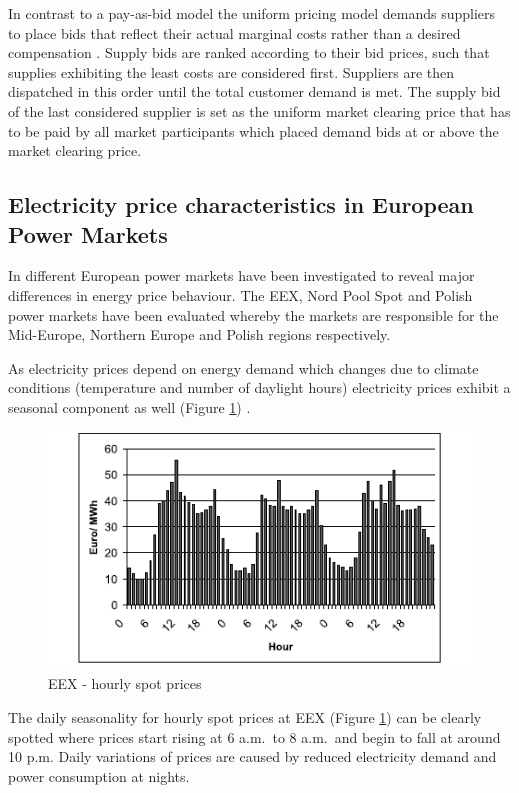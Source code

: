In contrast to a pay-as-bid model the uniform pricing model demands suppliers to place bids that reflect their actual marginal costs rather than a desired compensation \cite{tierney2008uniform}. Supply bids are ranked according to their bid prices, such that supplies exhibiting the least costs are considered first. Suppliers are then dispatched in this order until the total customer demand is met. The supply bid of the last considered supplier is set as the uniform market clearing price that has to be paid by all market participants which placed demand bids at or above the market clearing price. 

\subsection{Electricity price characteristics in European Power Markets}

In \cite{mugele2005stable} different European power markets have been investigated to reveal major differences in energy price behaviour. The EEX, Nord Pool Spot and Polish power markets have been evaluated whereby the markets are responsible for the Mid-Europe, Northern Europe and Polish regions respectively. 

As electricity prices depend on energy demand which changes due to climate conditions (temperature and number of daylight hours) electricity prices exhibit a seasonal component as well (Figure \ref{fig:seasonal_behaviour_of_eex_prices}) \cite{weron2005forecasting}. 

\begin{figure}[htbp]
	\centering
		\includegraphics{figures/state_of_the_art/seasonal_behaviour_of_eex_prices.PNG}
	\caption{EEX - hourly spot prices \cite{mugele2005stable}}
	\label{fig:seasonal_behaviour_of_eex_prices}
\end{figure}

The daily seasonality for hourly spot prices at EEX (Figure \ref{fig:seasonal_behaviour_of_eex_prices}) can be clearly spotted where prices 
start rising at 6 a.m.~to 8 a.m.~and begin to fall at around 10 p.m. Daily variations of prices are caused by reduced electricity demand and power consumption at nights. 

